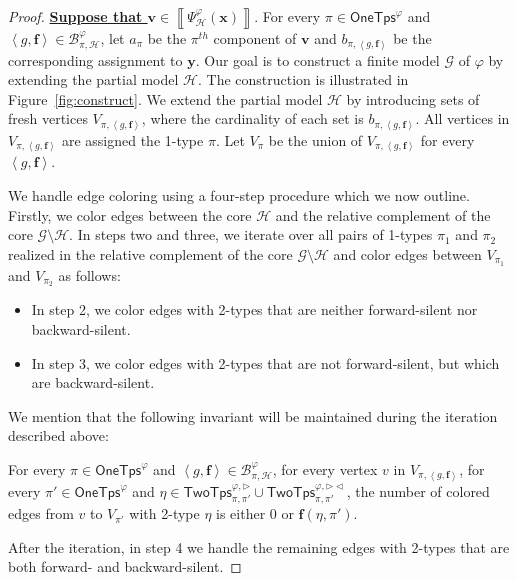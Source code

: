 \documentclass[10pt,a4paper]{article}
\theoremstyle{definition}
\theoremstyle{remark}
\newcommand{\cB}{\mathcal{B}}
\newcommand{\cG}{\mathcal{G}}
\newcommand{\cH}{\mathcal{H}}
\newcommand{\cK}{\mathsf{TwoTps}}
\newcommand{\bff}{\mathbf{f}}
\newcommand{\bfv}{\mathbf{v}}
\newcommand{\bfx}{\mathbf{x}}
\newcommand{\bfy}{\mathbf{y}}
\newcommand{\onetypes}{\mathsf{OneTps}}
\newcommand{\tuple}[1]       {\left\langle #1 \right\rangle}
\newcommand{\sol}[1] {\left\llbracket #1 \right\rrbracket}
\newcommand{\trif} {\triangleright}
\newcommand{\trib} {\triangleleft}
\newcommand{\cKvpf}     {\cK^{\varphi, \trif}}
\newcommand{\cKvpfb}    {\cK^{\varphi, \trif\trib}}
\begin{document}
\begin{proof}
    \textbf{\uline{Suppose that $\bfv \in \sol{\Psi^\varphi_\cH(\bfx)}$}}.
    For every $\pi \in \onetypes^\varphi$ and
    $\tuple{g, \bff} \in \cB^\varphi_{\pi, \cH}$,
    let $a_\pi$ be the $\pi^{th}$ component of $\bfv$ and
    $b_{\pi, \tuple{g, \bff}}$ be the corresponding assignment to $\bfy$.
    Our goal is to construct a finite model $\cG$ of $\varphi$ by extending the partial model $\cH$.
    The construction is illustrated in Figure~\ref{fig:construct}.
    We extend the partial model $\cH$ by introducing sets of fresh vertices $V_{\pi, \tuple{g, \bff}}$,
    where the cardinality of each set is $b_{\pi, \tuple{g, \bff}}$.
    All vertices in $V_{\pi, \tuple{g, \bff}}$ are assigned the 1-type $\pi$.
    Let $V_{\pi}$ be the union of $V_{\pi, \tuple{g, \bff}}$ for every $\tuple{g, \bff}$.

    We handle edge coloring using a four-step procedure which we now outline.
    Firstly, we
    color edges between the core $\cH$ and the relative complement of the core $\cG \setminus \cH$.
    In steps two and three,
    we iterate over all pairs of 1-types $\pi_1$ and $\pi_2$ realized in the relative complement of the core $\cG \setminus \cH$ and color edges between $V_{\pi_1}$ and $V_{\pi_2}$ as follows:
    \begin{itemize}
        \item In step 2, we color edges with 2-types that are neither forward-silent nor backward-silent.
        \item In step 3, we color edges with 2-types that are not forward-silent,  but which are backward-silent.
    \end{itemize}
    We mention that the following invariant will be maintained during the iteration described above:

    \medskip

    For every $\pi \in \onetypes^\varphi$ and $\tuple{g, \bff} \in \cB^\varphi_{\pi, \cH}$,
    for every vertex $v$ in $V_{\pi, \tuple{g, \bff}}$,
    for every $\pi' \in \onetypes^\varphi$ and $\eta \in \cKvpf_{\pi, \pi'} \cup \cKvpfb_{\pi, \pi'}$,
    the number of colored edges from $v$ to $V_{\pi'}$ with 2-type $\eta$ is either 0 or $\bff(\eta, \pi')$.

    \medskip

    After the iteration, in step 4 we handle the remaining edges with 2-types that are both forward- and backward-silent.
    

\end{proof}
\end{document}

